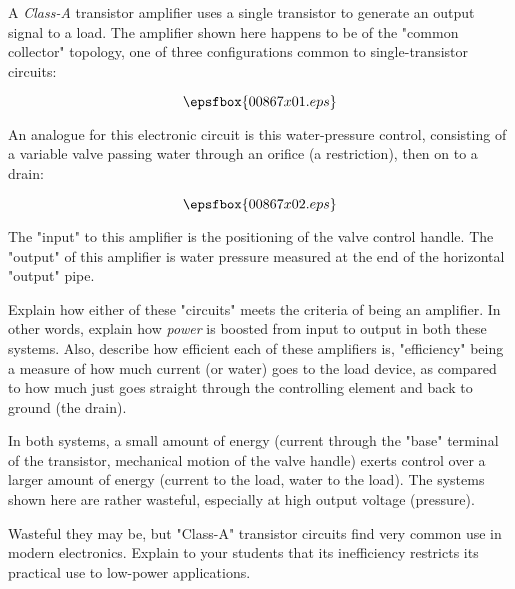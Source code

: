 

A {\it Class-A} transistor amplifier uses a single transistor to generate an output signal to a load.  The amplifier shown here happens to be of the "common collector" topology, one of three configurations common to single-transistor circuits:

$$\epsfbox{00867x01.eps}$$

An analogue for this electronic circuit is this water-pressure control, consisting of a variable valve passing water through an orifice (a restriction), then on to a drain:

$$\epsfbox{00867x02.eps}$$

The "input" to this amplifier is the positioning of the valve control handle.  The "output" of this amplifier is water pressure measured at the end of the horizontal "output" pipe.

\vskip 10pt

Explain how either of these "circuits" meets the criteria of being an amplifier.  In other words, explain how {\it power} is boosted from input to output in both these systems.  Also, describe how efficient each of these amplifiers is, "efficiency" being a measure of how much current (or water) goes to the load device, as compared to how much just goes straight through the controlling element and back to ground (the drain).







In both systems, a small amount of energy (current through the "base" terminal of the transistor, mechanical motion of the valve handle) exerts control over a larger amount of energy (current to the load, water to the load).  The systems shown here are rather wasteful, especially at high output voltage (pressure).







Wasteful they may be, but "Class-A" transistor circuits find very common use in modern electronics.  Explain to your students that its inefficiency restricts its practical use to low-power applications.




